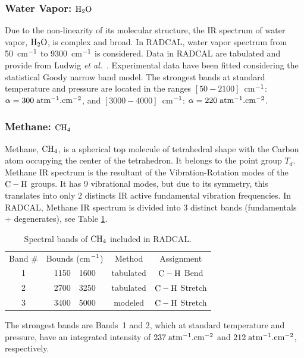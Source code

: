 \subsubsection{Water Vapor: $\rm H_2O$}

  Due to the non-linearity of its molecular structure, 
  the IR spectrum of water vapor, $\rm H_2O$, is complex and broad.
  In RADCAL, water vapor spectrum from 50~cm$\rm ^{-1}$ to 
  9300~cm$\rm ^{-1}$ is considered. Data in RADCAL
  are tabulated and provide from Ludwig \textit{et al.}~\cite{Ludwig:NASA}.
  Experimental data have been fitted considering the statistical Goody narrow band model.
  The strongest bands at standard temperature and pressure
  are located in the ranges $\left[50-2100\right]$~cm$\rm ^{-1}$: $\alpha = 300\;\rm {atm^{-1}.cm^{-2}}$,
  and $\left[3000-4000\right]$~cm$\rm ^{-1}$: $\alpha = 220\;\rm {atm^{-1}.cm^{-2}}$.

\subsubsection{Methane: $\rm CH_4$}
  
  Methane, $\rm CH_4$, is a spherical top molecule of tetrahedral shape with the Carbon atom occupying
  the center of the tetrahedron.
  It belongs to the point group $T_d$. Methane IR spectrum
  is the resultant of the Vibration-Rotation modes of
  the $\rm C-H$ groups.
  It has 9 vibrational modes, but due to its symmetry, this translates
  into only 2 distincts IR active fundamental vibration frequencies.
  In RADCAL, Methane IR spectrum is divided into 3 distinct bands
  (fundamentals + degenerates), see Table \ref{Table::CH4}.
  \begin{table}[h p] 
      \centering 
      \caption{Spectral bands of $\rm CH_4$ included in RADCAL.}
      \vspace{0.1in}
      \label{Table::CH4}
    \begin{tabular}{|c|r@{-}l|c|c|} 
    \hline
    Band \# & \multicolumn{2}{|l|}{Bounds (cm$\rm ^{-1}$) } & Method & Assignment \\
    \cline{1-5}  
    1 & 1150 & 1600 & tabulated &  $\rm C-H$ Bend\\
    2 & 2700 & 3250 & tabulated &  $\rm C-H$ Stretch\\
    3 & 3400 & 5000 & modeled   &  $\rm C-H$ Stretch \\
    \hline
   \end{tabular} 
  \end{table}
  The strongest bands are Bands~1 and 2, which at standard temperature and 
  pressure, have an integrated intensity
  of $237\;\rm {atm^{-1}.cm^{-2}}$ and 
  $212\;\rm {atm^{-1}.cm^{-2}}$, respectively.
  
